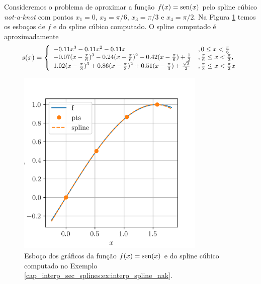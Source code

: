 \begin{ex}\label{cap_interp_sec_splines:ex:interp_spline_nak}
  Consideremos o problema de aproximar a função $f(x)=\operatorname{sen}(x)$ pelo spline cúbico {\it not-a-knot} com pontos $x_1=0$, $x_2=\pi/6$, $x_3=\pi/3$ e $x_4=\pi/2$. Na Figura \ref{cap_interp_sec_splines:fig:interp_spline_nak} temos os esboços de $f$ e do spline cúbico computado. O spline computado é aproximadamente
  \begin{equation}
    s(x) = \small\left\{\begin{array}{ll}
                          -0.11x^3 - 0.11x^2 - 0.11x &, 0\leq x < \frac{\pi}{6}\\
                          -0.07(x-\frac{\pi}{6})^3 - 0.24(x-\frac{\pi}{6})^2 - 0.42(x-\frac{\pi}{6}) + \frac{1}{2} &, \frac{\pi}{6} \leq x < \frac{\pi}{3},\\
                          1.02(x-\frac{\pi}{3})^3 + 0.86(x-\frac{\pi}{3})^2 + 0.51(x-\frac{\pi}{3}) + \frac{\sqrt{3}}{2} &, \frac{\pi}{3} \leq x < \frac{\pi}{2}x
                                                                                                                     
    \end{array}\right.
  \end{equation}

  \begin{figure}[H]
    \centering
    \includegraphics[width=0.8\textwidth]{./cap_interp/dados/fig_CSNotAKnot/fig}
    \caption{Esboço dos gráficos da função $f(x)=\operatorname{sen}(x)$ e do spline cúbico computado no Exemplo \ref{cap_interp_sec_splines:ex:interp_spline_nak}.}
    \label{cap_interp_sec_splines:fig:interp_spline_nak}
  \end{figure}


\end{ex}
